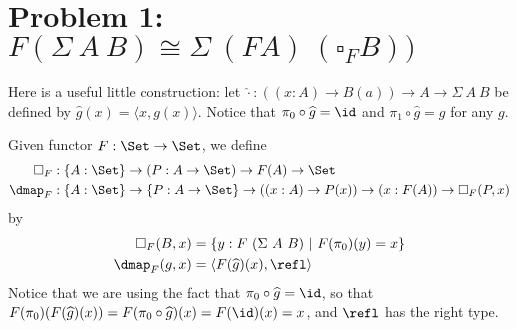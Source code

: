 \documentclass{article}
\begin{document}
\section*{Problem 1: $F (\Sigma\ A\ B) \cong \Sigma\ (F A)\ (\square_F B))$}

Here is a useful little construction: let $\widehat{\cdot} : ((x : A)
\to B(a)) \to A \to \Sigma\ A\ B$ be defined by $\widehat{g}(x) =
\langle x , g(x)\rangle$. Notice that $\pi_0 \circ \widehat{g} = \id$
and $\pi_1 \circ \widehat{g} = g$ for any $g$.

\begin{definition}
  Given functor $F : \Set \to \Set$, we define
\begin{align*}
\square_F &: \{A : \Set\} \to (P : A \to \Set) \to F(A) \to \Set \\
\dmap_F &: \{A : \Set\} \to \{P : A \to \Set\} \to ((x : A) \to  P(x)) \to (x : F(A)) \to \square_F(P, x)
\end{align*}
  by
\begin{align*}
  \square_F(B, x) &= \{ y : F\ (\Sigma\ A\ B )\ |\ F(\pi_0)(y) = x\} \\
  \dmap_F(g, x) &= \langle F(\widehat{g})(x), \refl\rangle
\end{align*}
Notice that we are using the fact that $\pi_0 \circ \widehat{g} = \id$, so that $F(\pi_0)(F(\widehat{g})(x)) = F(\pi_0 \circ \widehat{g})(x) = F(\id)(x) = x$, and $\refl$ has the right type.
\end{definition}
\end{document}
